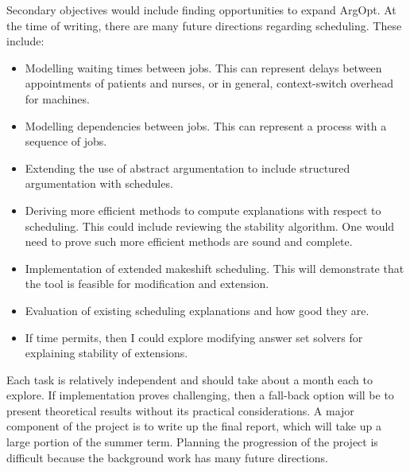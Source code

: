 Secondary objectives would include finding opportunities to expand ArgOpt. At the time of writing, there are many future directions regarding scheduling. These include:
\begin{itemize}
	\item Modelling waiting times between jobs. This can represent delays between appointments of patients and nurses, or in general, context-switch overhead for machines.
	\item Modelling dependencies between jobs. This can represent a process with a sequence of jobs.
	\item Extending the use of abstract argumentation to include structured argumentation with schedules.
	\item Deriving more efficient methods to compute explanations with respect to scheduling. This could include reviewing the stability algorithm. One would need to prove such more efficient methods are sound and complete.
	\item Implementation of extended makeshift scheduling. This will demonstrate that the tool is feasible for modification and extension.
	\item Evaluation of existing scheduling explanations and how good they are.
	\item If time permits, then I could explore modifying answer set solvers for explaining stability of extensions.
\end{itemize}

Each task is relatively independent and should take about a month each to explore. If implementation proves challenging, then a fall-back option will be to present theoretical results without its practical considerations. A major component of the project is to write up the final report, which will take up a large portion of the summer term. Planning the progression of the project is difficult because the background work has many future directions.
